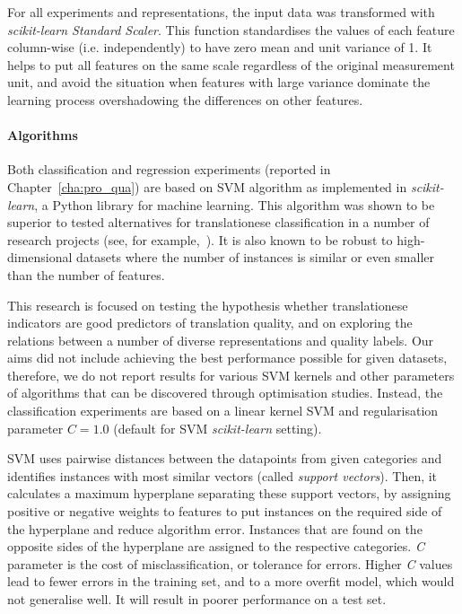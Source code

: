 For all experiments and representations, the input data was transformed with \textit{scikit-learn Standard Scaler}. This function standardises the values of each feature column-wise (i.e. independently) to have zero mean and unit variance of 1. It helps to put all features on the same scale regardless of the original measurement unit, and avoid the situation when features with large variance dominate the learning process overshadowing the differences on other features.

\paragraph{Algorithms} Both classification and regression experiments (reported in Chapter~\ref{cha:pro_qua}) are based on \gls{SVM} algorithm as implemented in \textit{scikit-learn}, a Python library for machine learning. 
This algorithm was shown to be superior to tested alternatives for translationese classification in a number of research projects (see, for example,~\cite{Ilisei2010}). It is also known to be robust to high-dimensional datasets where the number of instances is similar or even smaller than the number of features.

This research is focused on testing the hypothesis whether translationese indicators are good predictors of translation quality, and on exploring the relations between a number of diverse representations and quality labels. Our aims did not include achieving the best performance possible for given datasets, therefore, we do not report results for various SVM kernels and other parameters of algorithms that can be discovered through optimisation studies. 
Instead, the classification experiments are based on a linear kernel SVM and regularisation parameter $C=1.0$ (default for SVM \textit{scikit-learn} setting).

SVM uses pairwise distances between the datapoints from given categories and identifies instances with most similar vectors (called \textit{support vectors}). Then, it calculates a maximum hyperplane separating these support vectors, by assigning positive or negative weights to features to put instances on the required side of the hyperplane and reduce algorithm error. Instances that are found on the opposite sides of the hyperplane are assigned to the respective categories. 
\textit{C} parameter is the cost of misclassification, or tolerance for errors. Higher \textit{C} values lead to fewer errors in the training set, and to a more overfit model, which would not generalise well. It will result in poorer performance on a test set.

